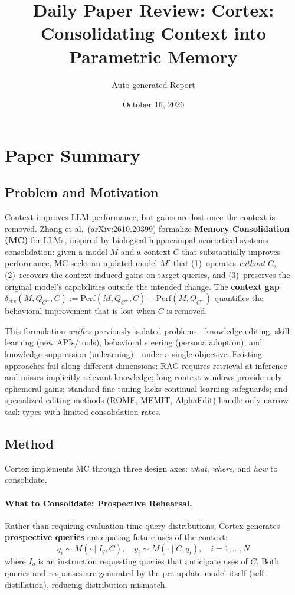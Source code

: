 \documentclass[11pt,a4paper]{article}
\title{Daily Paper Review: Cortex: Consolidating Context into Parametric Memory}
\author{Auto-generated Report}
\date{October 16, 2026}
\begin{document}
\maketitle

\section{Paper Summary}

\subsection{Problem and Motivation}
Context improves LLM performance, but gains are lost once the context is removed. Zhang et al.\ (arXiv:2610.20399) formalize \textbf{Memory Consolidation (MC)} for LLMs, inspired by biological hippocampal-neocortical systems consolidation: given a model $M$ and a context $C$ that substantially improves performance, MC seeks an updated model $M'$ that (1)~operates \emph{without} $C$, (2)~recovers the context-induced gains on target queries, and (3)~preserves the original model's capabilities outside the intended change. The \textbf{context gap} $\delta_{\text{ctx}}(M, Q_{C^+}, C) := \text{Perf}(M, Q_{C^+}, C) - \text{Perf}(M, Q_{C^+})$ quantifies the behavioral improvement that is lost when $C$ is removed.

This formulation \emph{unifies} previously isolated problems---knowledge editing, skill learning (new APIs/tools), behavioral steering (persona adoption), and knowledge suppression (unlearning)---under a single objective. Existing approaches fail along different dimensions: RAG requires retrieval at inference and misses implicitly relevant knowledge; long context windows provide only ephemeral gains; standard fine-tuning lacks continual-learning safeguards; and specialized editing methods (ROME, MEMIT, AlphaEdit) handle only narrow task types with limited consolidation rates.

\subsection{Method}
Cortex implements MC through three design axes: \emph{what}, \emph{where}, and \emph{how} to consolidate.

\paragraph{What to Consolidate: Prospective Rehearsal.}
Rather than requiring evaluation-time query distributions, Cortex generates \textbf{prospective queries} anticipating future uses of the context:
\begin{equation}
q_i \sim M(\cdot \mid I_q, C), \quad y_i \sim M(\cdot \mid C, q_i), \quad i = 1, \ldots, N
\end{equation}
where $I_q$ is an instruction requesting queries that anticipate uses of $C$. Both queries and responses are generated by the pre-update model itself (self-distillation), reducing distribution mismatch.
\end{document}
